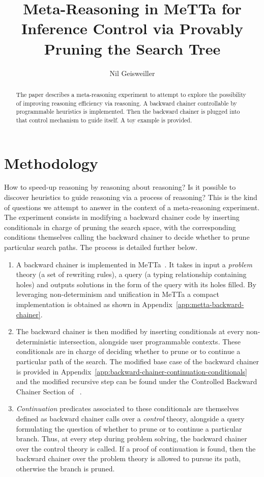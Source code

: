 \documentclass{easychair}
\title{Meta-Reasoning in MeTTa for Inference Control via Provably
  Pruning the Search Tree}
\author{Nil Geisweiller}
\institute{
  SingularityNET Foundation,\\
  Zug, Switzerland\\
  \email{nil@singularitynet.io}
}
\begin{document}
\maketitle

\begin{abstract}
The paper describes a meta-reasoning experiment to attempt to explore
the possibility of improving reasoning efficiency via reasoning. A
backward chainer controllable by programmable heuristics is
implemented. Then the backward chainer is plugged into that control
mechanism to guide itself.  A toy example is provided.
\end{abstract}

\section{Methodology}
\label{sect:introduction}

How to speed-up reasoning by reasoning about reasoning?  Is it
possible to discover heuristics to guide reasoning via a process of
reasoning?  This is the kind of questions we attempt to answer in the
context of a meta-reasoning experiment.  The experiment consists in
modifying a backward chainer code by inserting conditionals in charge
of pruning the search space, with the corresponding conditions
themselves calling the backward chainer to decide whether to prune
particular search paths.  The process is detailed further below.
\begin{enumerate}
\item A backward chainer is implemented in MeTTa~\cite{MeTTa,
  MeTTaSpecification2021, Goertzel2021MeTTa, Meredith2023}.  It takes
  in input a \emph{problem} theory (a set of rewriting rules), a query
  (a typing relationship containing holes) and outputs solutions in
  the form of the query with its holes filled.  By leveraging
  non-determinism and unification in MeTTa a compact implementation is
  obtained as shown in Appendix~\ref{app:metta-backward-chainer}.
\item The backward chainer is then modified by inserting conditionals
  at every non-deterministic intersection, alongside user programmable
  contexts.  These conditionals are in charge of deciding whether to
  prune or to continue a particular path of the search.  The modified
  base case of the backward chainer is provided in
  Appendix~\ref{app:backward-chainer-continuation-conditionals} and
  the modified recursive step can be found under the Controlled
  Backward Chainer Section of ~\cite{Geisweiller2024ICM}.
\item \emph{Continuation} predicates associated to these conditionals
  are themselves defined as backward chainer calls over a
  \emph{control} theory, alongside a query formulating the question of
  whether to prune or to continue a particular branch.  Thus, at every
  step during problem solving, the backward chainer over the control
  theory is called.  If a proof of continuation is found, then the
  backward chainer over the problem theory is allowed to pursue its
  path, otherwise the branch is pruned.
\end{enumerate}
\end{document}
